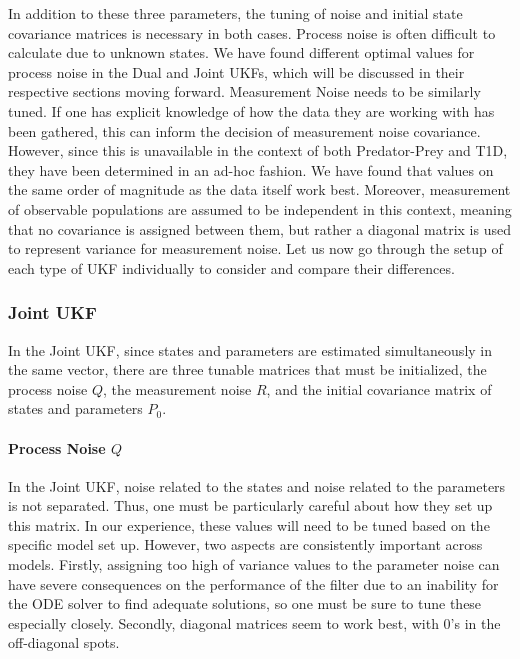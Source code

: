 In addition to these three parameters, the tuning of noise and initial state covariance matrices is necessary in both cases. Process noise is often difficult to calculate due to unknown states. We have found different optimal values for process noise in the Dual and Joint UKFs, which will be discussed in their respective sections moving forward. Measurement Noise needs to be similarly tuned. If one has explicit knowledge of how the data they are working with has been gathered, this can inform the decision of measurement noise covariance. However, since this is unavailable in the context of both Predator-Prey and T1D, they have been determined in an ad-hoc fashion. We have found that values on the same order of magnitude as the data itself work best. Moreover, measurement of observable populations are assumed to be independent in this context, meaning that no covariance is assigned between them, but rather a diagonal matrix is used to represent variance for measurement noise. Let us now go through the setup of each type of UKF individually to consider and compare their differences.


\subsubsection{Joint UKF}

In the Joint UKF, since states and parameters are estimated simultaneously in the same vector, there are three tunable matrices that must be initialized, the process noise $Q$, the measurement noise $R$, and the initial covariance matrix of states and parameters $P_0$. 

\paragraph{Process Noise $Q$}
In the Joint UKF, noise related to the states and noise related to the parameters is not separated. Thus, one must be particularly careful about how they set up this matrix. In our experience, these values will need to be tuned based on the specific model set up. However, two aspects are consistently important across models. Firstly, assigning too high of variance values to the parameter noise can have severe consequences on the performance of the filter due to an inability for the ODE solver to find adequate solutions, so one must be sure to tune these especially closely. Secondly, diagonal matrices seem to work best, with 0's in the off-diagonal spots. \\

